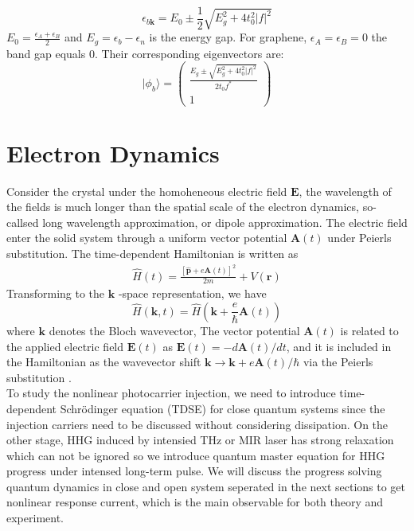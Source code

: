 \begin{equation}
	\epsilon_{b\mathbf{k}}=E_{0} \pm \frac{1}{2} \sqrt{E_{g}^{2}+4t_{0}^{2}|f|^{2}}
	\label{eigenvalues}
\end{equation}
$E_{0}=\frac{\epsilon_{A}+\epsilon_{B}}{2}$ and $E_{g}=\epsilon_{b}-\epsilon_{n}$ is the energy gap. For graphene, $\epsilon_{A} = \epsilon_{B} =0$ the band gap equals 0.
Their corresponding eigenvectors are:
\begin{equation}
	|\phi_{b}\rangle  =\left(\begin{array}{cc}
			\frac{E_{g} \pm \sqrt{E_{g}^{2}+4t_{0}^{2}|f|^{2}}}{2t_{0} f^*} \\
			1
		\end{array}\right)
	\label{eqn:eigenvector}
\end{equation}

\section{Electron Dynamics}
Consider the crystal under the homoheneous electric field $\mathbf {E}$, the wavelength of the fields
is much longer than the spatial scale of the electron dynamics, so-callsed long wavelength approximation, or dipole approximation. The electric field enter the solid system through a uniform
vector potential $\mathbf {A} (t)$ under Peierls substitution\cite{hofstadter1976energy}. The time-dependent Hamiltonian is written as
\begin{align}
	\hat{H}(t)=\frac{[\hat{\mathbf{p}}+e \mathbf{A}(t)]^{2}}{2 m}+V(\mathbf{r})
\end{align}
Transforming to the $\mathbf{k}$ -space representation, we have
\begin{equation}
	\hat{H}(\mathbf{k}, t)=\hat{H}\left(\mathbf{k}+\frac{e}{\hbar} \mathbf{A}(t)\right)
	\label{eqn:vTD}
\end{equation}
where $\mathbf k$ denotes the Bloch wavevector, The vector potential $\mathbf A(t)$ is related to the applied electric field $\mathbf E(t)$ as $\mathbf E(t)=-d\mathbf A(t)/dt$, and it is included in the Hamiltonian as the wavevector shift $\mathbf k \rightarrow \mathbf k + e\mathbf A(t)/\hbar$ via the Peierls substitution  \cite{hofstadter1976energy}.\\

To study the nonlinear photocarrier injection, we need to introduce time-dependent Schr\"odinger
equation (\gls {TDSE}) for close quantum systems since the injection carriers need to be discussed
without considering dissipation. On the other stage, HHG induced by intensied THz or MIR laser has
strong relaxation which can not be ignored so we introduce quantum master equation for HHG progress
under intensed long-term pulse. We will discuss the progress solving quantum dynamics in close and
open system seperated in the next sections to get nonlinear response current, which is the main
observable for both theory and experiment.
